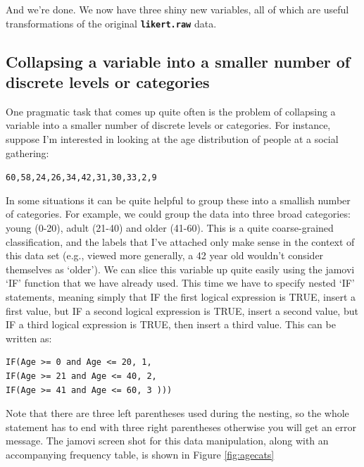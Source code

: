 \documentclass[
]{book}
\begin{document}
And we're done. We now have three shiny new variables, all of which are useful transformations of the original \textbf{\texttt{likert.raw}} data.

\hypertarget{collapsing-a-variable-into-a-smaller-number-of-discrete-levels-or-categories}{%
\subsection{Collapsing a variable into a smaller number of discrete levels or categories}\label{collapsing-a-variable-into-a-smaller-number-of-discrete-levels-or-categories}}

One pragmatic task that comes up quite often is the problem of collapsing a variable into a smaller number of discrete levels or categories. For instance, suppose I'm interested in looking at the age distribution of people at a social gathering:

\texttt{60,58,24,26,34,42,31,30,33,2,9}

In some situations it can be quite helpful to group these into a smallish number of categories. For example, we could group the data into three broad categories: young (0-20), adult (21-40) and older (41-60). This is a quite coarse-grained classification, and the labels that I've attached only make sense in the context of this data set (e.g., viewed more generally, a 42 year old wouldn't consider themselves as `older'). We can slice this variable up quite easily using the jamovi `IF' function that we have already used. This time we have to specify nested `IF' statements, meaning simply that IF the first logical expression is TRUE, insert a first value, but IF a second logical expression is TRUE, insert a second value, but IF a third logical expression is TRUE, then insert a third value. This can be written as:

\begin{verbatim}
IF(Age >= 0 and Age <= 20, 1,
IF(Age >= 21 and Age <= 40, 2,
IF(Age >= 41 and Age <= 60, 3 )))
\end{verbatim}

Note that there are three left parentheses used during the nesting, so the whole statement has to end with three right parentheses otherwise you will get an error message. The jamovi screen shot for this data manipulation, along with an accompanying frequency table, is shown in Figure \ref{fig:agecats}
\end{document}
